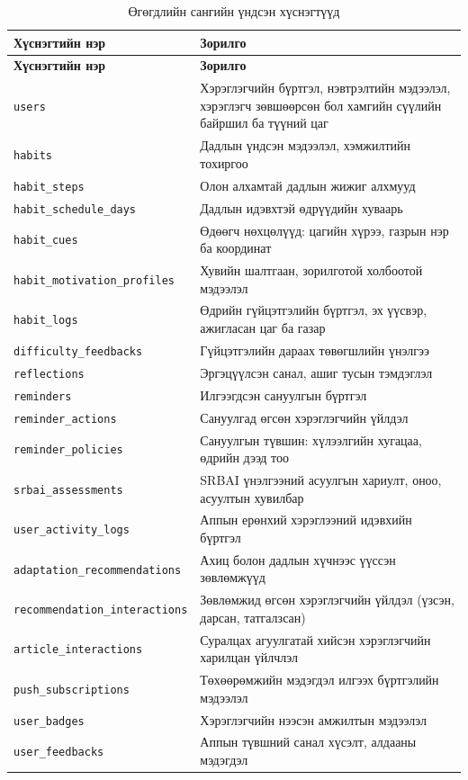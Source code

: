 {\small
\setlength{\tabcolsep}{4pt}
\begin{longtable}{|p{5.8cm}|p{7.2cm}|}
\caption{Өгөгдлийн сангийн үндсэн хүснэгтүүд}\label{tab:db-tables} \\
\hline
\textbf{Хүснэгтийн нэр} & \textbf{Зорилго} \\ \hline
\endfirsthead
\hline
\textbf{Хүснэгтийн нэр} & \textbf{Зорилго} \\ \hline
\endhead
\texttt{users} & Хэрэглэгчийн бүртгэл, нэвтрэлтийн мэдээлэл, хэрэглэгч зөвшөөрсөн бол хамгийн сүүлийн байршил ба түүний цаг \\ \hline
\texttt{habits} & Дадлын үндсэн мэдээлэл, хэмжилтийн тохиргоо \\ \hline
\texttt{habit\_steps} & Олон алхамтай дадлын жижиг алхмууд \\ \hline
\texttt{habit\_schedule\_days} & Дадлын идэвхтэй өдрүүдийн хуваарь \\ \hline
\texttt{habit\_cues} & Өдөөгч нөхцөлүүд: цагийн хүрээ, газрын нэр ба координат \\ \hline
\texttt{habit\_motivation\_profiles} & Хувийн шалтгаан, зорилготой холбоотой мэдээлэл \\ \hline
\texttt{habit\_logs} & Өдрийн гүйцэтгэлийн бүртгэл, эх үүсвэр, ажигласан цаг ба газар \\ \hline
\texttt{difficulty\_feedbacks} & Гүйцэтгэлийн дараах төвөгшлийн үнэлгээ \\ \hline
\texttt{reflections} & Эргэцүүлсэн санал, ашиг тусын тэмдэглэл \\ \hline
\texttt{reminders} & Илгээгдсэн сануулгын бүртгэл \\ \hline
\texttt{reminder\_actions} & Сануулгад өгсөн хэрэглэгчийн үйлдэл \\ \hline
\texttt{reminder\_policies} & Сануулгын түвшин: хүлээлгийн хугацаа, өдрийн дээд тоо \\ \hline
\texttt{srbai\_assessments} & SRBAI үнэлгээний асуулгын хариулт, оноо, асуултын хувилбар \\ \hline
\texttt{user\_activity\_logs} & Аппын ерөнхий хэрэглээний идэвхийн бүртгэл \\ \hline
\texttt{adaptation\_recommendations} & Ахиц болон дадлын хүчнээс үүссэн зөвлөмжүүд \\ \hline
\texttt{recommendation\_interactions} & Зөвлөмжид өгсөн хэрэглэгчийн үйлдэл (үзсэн, дарсан, татгалзсан) \\ \hline
\texttt{article\_interactions} & Суралцах агуулгатай хийсэн хэрэглэгчийн харилцан үйлчлэл \\ \hline
\texttt{push\_subscriptions} & Төхөөрөмжийн мэдэгдэл илгээх бүртгэлийн мэдээлэл \\ \hline
\texttt{user\_badges} & Хэрэглэгчийн нээсэн амжилтын мэдээлэл \\ \hline
\texttt{user\_feedbacks} & Аппын түвшний санал хүсэлт, алдааны мэдэгдэл \\ \hline
\end{longtable}
}

